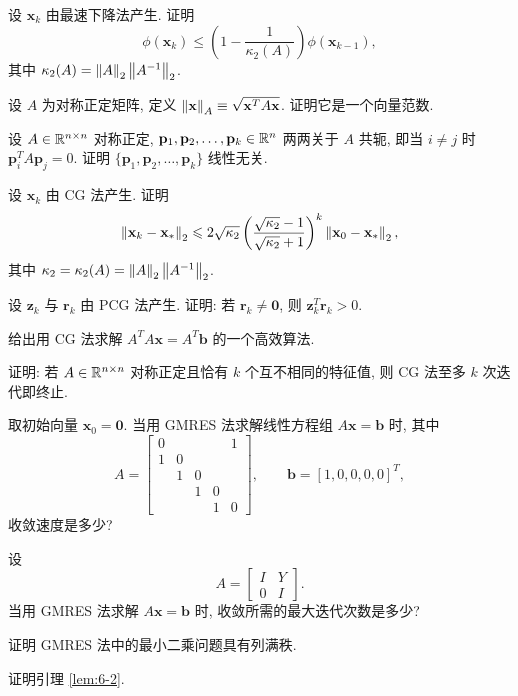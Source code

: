 \begin{exercises}
  \item 设 $\mathbf{x}_k$ 由最速下降法产生. 证明
    \[
      \phi(\mathbf{x}_k)\leqslant\left(1-\frac{1}{\kappa_2(A)}\right)
      \phi(\mathbf{x}_{k-1}),
    \]
    其中 $\kappa_2(A)=\left\|A\right\|_2\left\|A^{-1}\right\|_2$.

  \item 设 $A$ 为对称正定矩阵, 定义 $\left\|\mathbf{x}\right\|_A\equiv\sqrt{\mathbf{x}^TA\mathbf{x}}$. 证明它是一个向量范数.

  \item 设 $A\in\mathbb{R}^{n\times n}$ 对称正定, $\mathbf{p}_1,\mathbf{p}_2,\ldots,\mathbf{p}_k\in\mathbb{R}^n$ 两两关于 $A$ 共轭, 即当 $i\neq j$ 时 $\mathbf{p}_i^TA\mathbf{p}_j=0$. 证明 $\{\mathbf{p}_1,\mathbf{p}_2,\ldots,\mathbf{p}_k\}$ 线性无关.

  \item 设 $\mathbf{x}_k$ 由 CG 法产生. 证明
    \[
      \left\|\mathbf{x}_k-\mathbf{x}_*\right\|_2
      \leqslant2\sqrt{\kappa_2}
      \left(\frac{\sqrt{\kappa_2}-1}{\sqrt{\kappa_2}+1}\right)^k
      \left\|\mathbf{x}_0-\mathbf{x}_*\right\|_2,
    \]
    其中 $\kappa_2=\kappa_2(A)=\left\|A\right\|_2\left\|A^{-1}\right\|_2$.

  \item 设 $\mathbf{z}_k$ 与 $\mathbf{r}_k$ 由 PCG 法产生. 证明: 若 $\mathbf{r}_k\neq\mathbf{0}$, 则 $\mathbf{z}_k^T\mathbf{r}_k>0$.

  \item 给出用 CG 法求解 $A^TA\mathbf{x}=A^T\mathbf{b}$ 的一个高效算法.

  \item 证明: 若 $A\in\mathbb{R}^{n\times n}$ 对称正定且恰有 $k$ 个互不相同的特征值, 则 CG 法至多 $k$ 次迭代即终止.

  \item 取初始向量 $\mathbf{x}_0=\mathbf{0}$. 当用 GMRES 法求解线性方程组 $A\mathbf{x}=\mathbf{b}$ 时, 其中
    \[
      A=\begin{bmatrix}
        0 & & & & 1\\
        1 & 0 & & & \\
        & 1 & 0 & & \\
        & & 1 & 0 & \\
        & & & 1 & 0
      \end{bmatrix},
      \qquad
      \mathbf{b}=[1,0,0,0,0]^T,
    \]
    收敛速度是多少?

  \item 设
    \[
      A=\begin{bmatrix}
        I & Y\\
        0 & I
      \end{bmatrix}.
    \]
    当用 GMRES 法求解 $A\mathbf{x}=\mathbf{b}$ 时, 收敛所需的最大迭代次数是多少?

  \item 证明 GMRES 法中的最小二乘问题具有列满秩.

  \item 证明引理 \ref{lem:6-2}.
\end{exercises}
